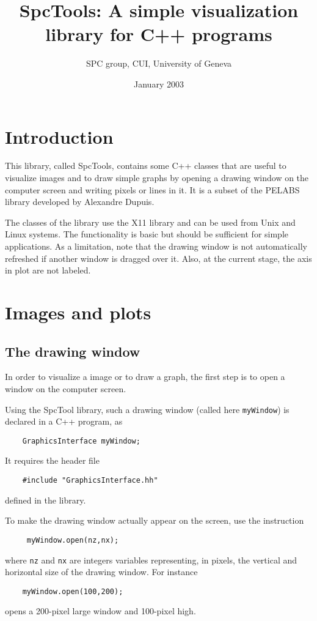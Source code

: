 \documentclass[12pt,a4paper]{article}
\title{SpcTools: A simple visualization library for C++ programs}
\author{SPC group, CUI, University of Geneva }
\date{January 2003}
\begin{document}
\maketitle

\section{Introduction}

This library, called SpcTools, contains some C++ classes that are
useful to visualize images and to draw simple graphs by opening a
drawing window on the computer screen and writing pixels or lines in
it. It is a subset of the PELABS library developed  by Alexandre Dupuis.

The classes of the library use the X11 library and can be used from Unix and Linux
systems.  The functionality is basic but should be sufficient for
simple applications.  As a limitation, note that the drawing window
is not automatically refreshed if another window is dragged over it.
Also, at the current stage, the axis in plot are not labeled.

\section{Images and plots}

\subsection{The drawing window}

In order to visualize a image or to draw a graph, the first step is to
open a window on the computer screen.

Using the SpcTool library, such a drawing window (called here {\tt myWindow}) is
declared in a C++ program, as
\begin{verbatim}
    GraphicsInterface myWindow;
\end{verbatim}
It requires the header file
\begin{verbatim}    
    #include "GraphicsInterface.hh"
\end{verbatim}
defined in the library.

To make the drawing window actually appear on the screen, use the instruction 
\begin{verbatim}
     myWindow.open(nz,nx);
\end{verbatim}
where {\tt nz} and {\tt nx} are integers variables representing, in pixels,  the vertical and horizontal
size of the drawing window. For instance
\begin{verbatim}
    myWindow.open(100,200);
\end{verbatim}
opens a 200-pixel large window and 100-pixel high. 
\end{document}
